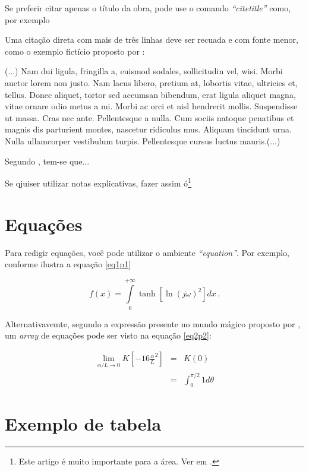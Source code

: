 \documentclass[
	12pt,				%
	openright,			%
	oneside,			%
	a4paper,			%
	english,			%
	brazil				%
	]{abntex2}
\begin{document}
Se preferir citar apenas o título da obra, pode use o comando \textit{``citetitle''} como, por exemplo 

Uma citação direta com mais de três linhas deve ser recuada e com fonte menor, como  o exemplo fictício proposto por \textcite{boyle1772-a}:

\begin{citacao}
	(...) Nam dui ligula, fringilla a, euismod sodales, sollicitudin vel, wisi. Morbi auctor lorem non justo. Nam lacus libero, pretium at, lobortis vitae, ultricies et, tellus. Donec aliquet, tortor sed accumsan bibendum, erat ligula aliquet magna, vitae ornare odio metus a mi. Morbi ac orci et nisl hendrerit mollis. Suspendisse ut massa. Cras nec ante. Pellentesque a nulla. Cum sociis natoque penatibus et magnis dis parturient montes, nascetur ridiculus mus. Aliquam tincidunt urna. Nulla ullamcorper vestibulum turpis. Pellentesque cursus luctus mauris.(...)
\end{citacao}

Segundo \cite{lima2025}, tem-se que...

Se qjuiser utilizar notas explicativas, fazer assim ó\footnote{Este artigo é muito importante para a área. Ver em \textcite[p.4]{lima2025}.}

\section{Equações}

Para redigir equações, você pode utilizar o ambiente \textit{``equation''}. Por exemplo, conforme ilustra a equação \eqref{eq1p1}

\begin{equation}
	f(x) = \int \limits_{0}^{+ \infty} \tanh \left[\ln (j \omega)^2 \right] dx \,. \label{eq1p1}
\end{equation}
 
Alternativavemte, segundo a expressão presente no mundo mágico proposto por \textcite[p.~3]{descartes-carta-mersene}, um \textit{array} de equações pode ser visto na equação \eqref{eq2p2}:

\begin{eqnarray}
	\lim_{\alpha / L \to 0} K  \left[-16 {{\frac{\alpha}{L}}^{2}}\right]  &=& K(0) \label{eq2p1} \nonumber \\ %
	&=& \int_{0}^{\pi / 2} 1 d\theta \label{eq2p2}
\end{eqnarray}

\section{Exemplo de tabela}
\end{document}
